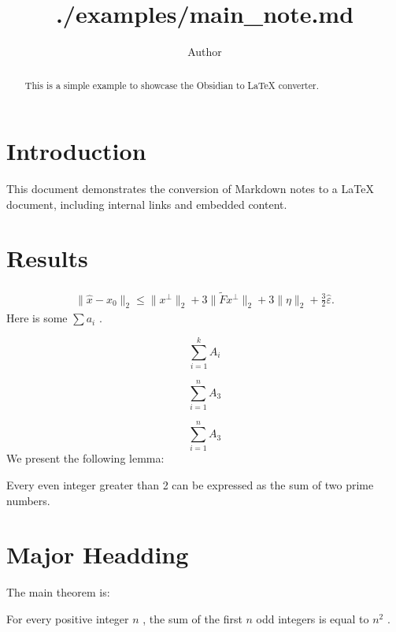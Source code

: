\documentclass{article}
\title{./examples/main_note.md}
\author{Author}
\begin{document}
\maketitle
\begin{abstract}
This is a simple example to showcase the Obsidian to LaTeX converter.


\end{abstract}

\section{Introduction}
\label{section:Introduction}
This document demonstrates the conversion of Markdown notes to a LaTeX document, including internal links and embedded content.

\section{Results}
\label{section:Results}

\begin{align*}
  \|\hat x - x_0\|_2
  \leq \|x^\perp\|_2 + 3\|\tilde{F}x^\perp\|_2 + 3 \|\eta\|_2 + \frac{3}{2}\hat\varepsilon.
\end{align*}
Here is some  $\sum a_i$ .

\begin{equation*}
\sum_{i=1}^k A_i
\end{equation*}

\begin{equation*}
\sum_{i=1}^n A_3
\end{equation*}

\begin{equation*}
\sum_{i=1}^n A_3
\end{equation*}
We present the following lemma:

\begin{lemma}[lemma_1]
\label{lemma_1}
Every even integer greater than 2 can be expressed as the sum of two prime numbers.


\end{lemma}


\section{Major Headding}
\label{section:Major Headding}
The main theorem is:

\begin{theorem}[theorem_1]
\label{theorem_1}
For every positive integer  $n$ , the sum of the first  $n$  odd integers is equal to  $n^2$ .


\end{theorem}
\end{document}

